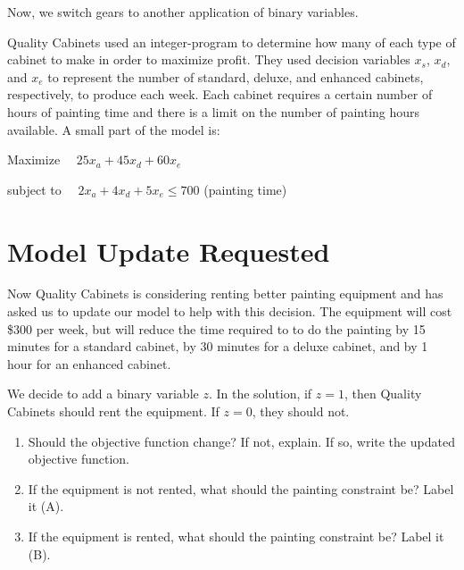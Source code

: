 \documentclass[11pt]{article}
\theoremstyle{definition}
\begin{document}
Now, we switch gears to another application of binary variables.

Quality Cabinets used an integer-program to determine how many of each type of cabinet to make in order to maximize profit. They used decision variables $x_s$, $x_d$, and $x_e$ to represent the number of standard, deluxe, and enhanced cabinets, respectively, to produce each week. Each cabinet requires a certain number of hours of painting time and there is a limit on the number of painting hours available. A small part of the model is:

\begin{tcolorbox}
Maximize ~~$25x_a + 45x_d + 60x_e$

\smallskip
subject to ~~$2x_a + 4x_d + 5x_e \leq 700$ \hspace{1in} (painting time)
\end{tcolorbox} \vspace{1in}

\section{Model Update Requested}
Now Quality Cabinets is considering renting better painting equipment and has asked us to update our model to help with this decision.  The equipment will cost \$300 per week, but will reduce the time required to to do the painting by 15 minutes for a standard cabinet, by 30 minutes for a deluxe cabinet, and by 1 hour for an enhanced cabinet.

We decide to add a binary variable $z$.  In the solution, if $z = 1$, then Quality Cabinets should rent the equipment.  If $z = 0$, they should not.  

\begin{enumerate}[resume]
\item Should the objective function change?  If not, explain.  If so, write the updated objective function.\\
\vspace{2in}

\item If the equipment is not rented, what should the painting constraint be?  Label it (A). \vspace{1in}

\item If the equipment is rented, what should the painting constraint be?  Label it (B). \vspace{1in}
\end{enumerate}
\end{document}
